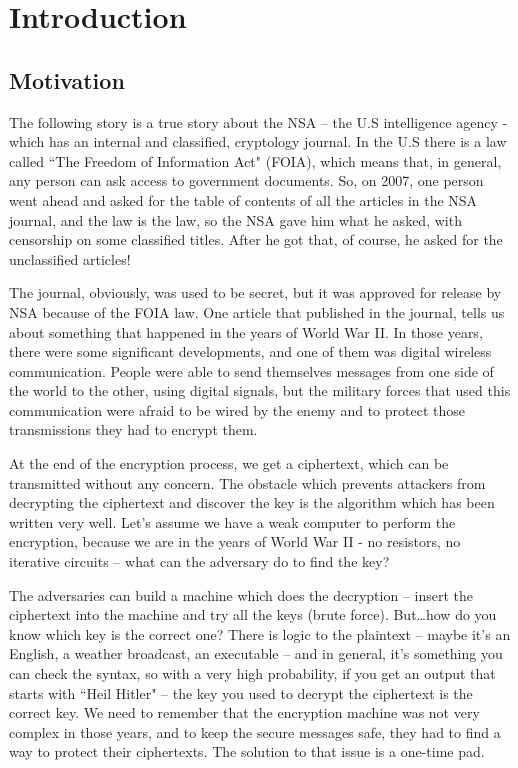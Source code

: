\chapter{Introduction} \label{chap:c1_IntroductionAOI}

\section{Motivation} \label{sec:Motivation} %

The following story is a true story about the NSA – the U.S intelligence agency
- which has an internal and classified, cryptology journal. In the U.S there is
a law called ``The Freedom of Information Act" (FOIA), which means that, in
general, any person can ask access to government documents. So, on 2007, one
person went ahead and asked for the table of contents of all the articles in the
NSA journal, and the law is the law, so the NSA gave him what he asked, with
censorship on some classified titles. After he got that, of course, he asked for
the unclassified articles!

The journal, obviously, was used to be secret, but it was approved for release
by NSA because of the FOIA law. One article that published in the journal, tells
us about something that happened in the years of World War II. In those years,
there were some significant developments, and one of them was digital wireless
communication. People were able to send themselves messages from one side of the
world to the other, using digital signals, but the military forces that used
this communication were afraid to be wired by the enemy and to protect those
transmissions they had to encrypt them. 

At the end of the encryption process, we get a ciphertext, which can be
transmitted without any concern. The obstacle which prevents attackers from
decrypting the ciphertext and discover the key is the algorithm which has been
written very well. Let's assume we have a weak computer to perform the
encryption, because we are in the years of World War II - no resistors, no
iterative circuits – what can the adversary do to find the key?

The adversaries can build a machine which does the decryption – insert the
ciphertext into the machine and try all the keys (brute force). But\ldots how do
you know which key is the correct one? There is logic to the plaintext – maybe
it's an English, a weather broadcast, an executable – and in general, it's
something you can check the syntax, so with a very high probability, if you get
an output that starts with ``Heil Hitler" – the key you used to decrypt the
ciphertext is the correct key. We need to remember that the encryption machine
was not very complex in those years, and to keep the secure messages safe, they
had to find a way to protect their ciphertexts. The solution to that issue is a
one-time pad.

